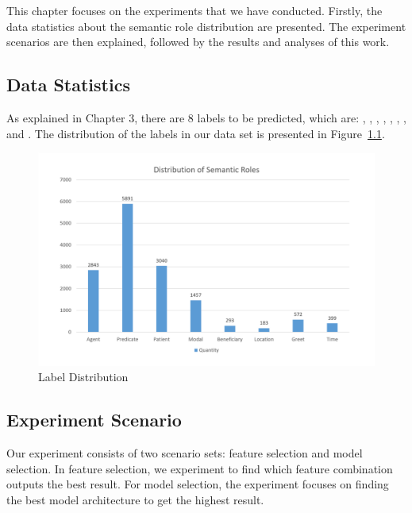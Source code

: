 \chapter{\babLima}

This chapter focuses on the experiments that we have conducted. Firstly, the data statistics about the semantic role distribution are presented. The experiment scenarios are then explained, followed by the results and analyses of this work.

\section{Data Statistics}
As explained in Chapter 3, there are 8 labels to be predicted, which are: \agent, \predicate, \patient, \modal, \beneficiary, \location, \greet, and \timesrl. The distribution of the labels in our data set is presented in Figure~\ref{fig:srldistribution}.

\begin{figure}
	\centering
	\includegraphics[width=\linewidth]{images/srldistribution}
	\caption{Label Distribution}
	\label{fig:srldistribution}
\end{figure}

\section{Experiment Scenario}
Our experiment consists of two scenario sets: feature selection and model selection. In feature selection, we experiment to find which feature combination outputs the best result. For model selection, the experiment focuses on finding the best model architecture to get the highest result.

